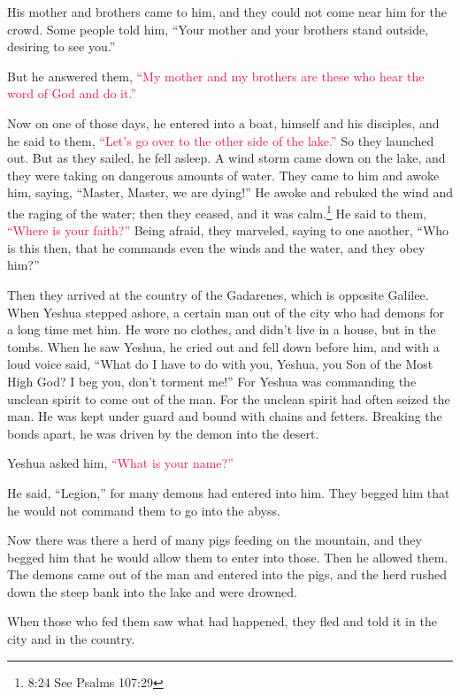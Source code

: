 \myverse{}His mother and brothers came to him, and they could not come
near him for the crowd.
\myverse{}Some people told him, “Your mother and your brothers stand outside, desiring
to see you.”

\myverse{}But he answered them,
\textcolor{crimson}{“My mother and my brothers are these who hear the word of God and do it.”}

\myverse{}Now on one of those days, he entered into a boat, himself and
his disciples, and he said to them,
\textcolor{crimson}{“Let’s go over to the other side of the lake.”} So they launched out.
\myverse{}But as they sailed, he fell asleep. A wind storm came down on the lake, and
they were taking on dangerous amounts of water.
\myverse{}They came to him and awoke him, saying, “Master, Master, we are dying!” He
awoke and rebuked the wind and the raging of the water; then they ceased, and it was calm.\footnote{ 8:24 See
	Psalms 107:29}
\myverse{}He said to them,
\textcolor{crimson}{“Where is your faith?”} Being afraid, they marveled, saying to one another, “Who is this then,
that he commands even the winds and the water, and they obey him?”

\myverse{}Then they arrived at the country of the Gadarenes, which is opposite
Galilee.
\myverse{}When Yeshua stepped ashore, a certain man out of the city who had demons for
a long time met him. He wore no clothes, and didn’t live in a house, but in the tombs.
\myverse{}When he saw Yeshua, he cried out and fell down before him, and with a loud
voice said, “What do I have to do with you, Yeshua, you Son of the Most High God? I beg you, don’t torment
me!”
\myverse{}For Yeshua was commanding the unclean spirit to come out of the man. For the
unclean spirit had often seized the man. He was kept under guard and bound with chains and fetters. Breaking
the bonds apart, he was driven by the demon into the desert.

\myverse{}Yeshua asked him,
\textcolor{crimson}{“What is your name?”}

He said, “Legion,” for many demons had entered into him.
\myverse{}They begged him that he would not command them to go into the abyss.

\myverse{}Now there was there a herd of many pigs feeding on the mountain,
and they begged him that he would allow them to enter into those. Then he allowed them.
\myverse{}The demons came out of the man and entered into the pigs, and the herd rushed
down the steep bank into the lake and were drowned.

\myverse{}When those who fed them saw what had happened, they fled and
told it in the city and in the country.

